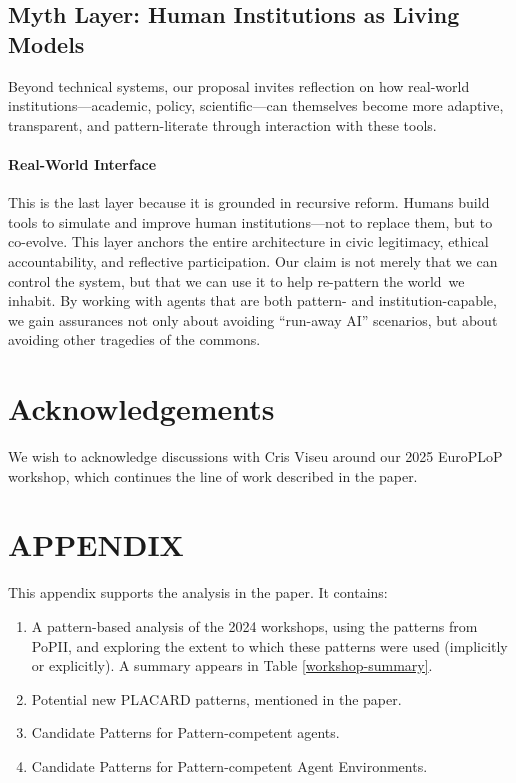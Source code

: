 \documentclass[acmlarge,timestamp]{acmart}
\begin{document}
\subsection*{ Myth Layer: Human Institutions as Living Models}

Beyond technical systems, our proposal invites reflection on how
real-world institutions---academic, policy, scientific---can
themselves become more adaptive, transparent, and pattern-literate
through interaction with these tools.

\paragraph{Real-World Interface}

This is the last layer because it is grounded in recursive reform.
Humans build tools to simulate and improve human institutions---not to
replace them, but to co-evolve.  This layer anchors the entire
architecture in civic legitimacy, ethical accountability, and
reflective participation. Our claim is not merely that we can control
the system, but that we can use it to help re-pattern the world~we
inhabit.  By working with agents that are both pattern- and
institution-capable, we gain assurances not only about avoiding
``run-away AI'' scenarios, but about avoiding other tragedies of the
commons.

\section{Acknowledgements}\label{sec:ack}
We wish to acknowledge discussions with Cris Viseu around our 2025
EuroPLoP workshop, which continues the line of work described in the paper.

\section*{APPENDIX}

This appendix supports the analysis in the paper. It contains:

\begin{enumerate}
\item A pattern-based analysis of the 2024 workshops, using the
  patterns from PoPII, and exploring the extent to which these
  patterns were used (implicitly or explicitly).  A summary appears in
  Table \ref{workshop-summary}.
\item Potential new PLACARD patterns, mentioned in the paper.
\item Candidate Patterns for Pattern-competent agents.
\item Candidate Patterns for Pattern-competent Agent Environments.
\end{enumerate}
\end{document}
